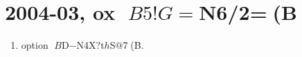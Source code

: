 \documentclass{jarticle}
\begin{document}
\section{2004-03, ox $B5!G=$N6/2=(B}
\begin{enumerate}
\item option $B$D$-$N4X?t$h$S$@$7(B.
\end{enumerate}
\end{document}
